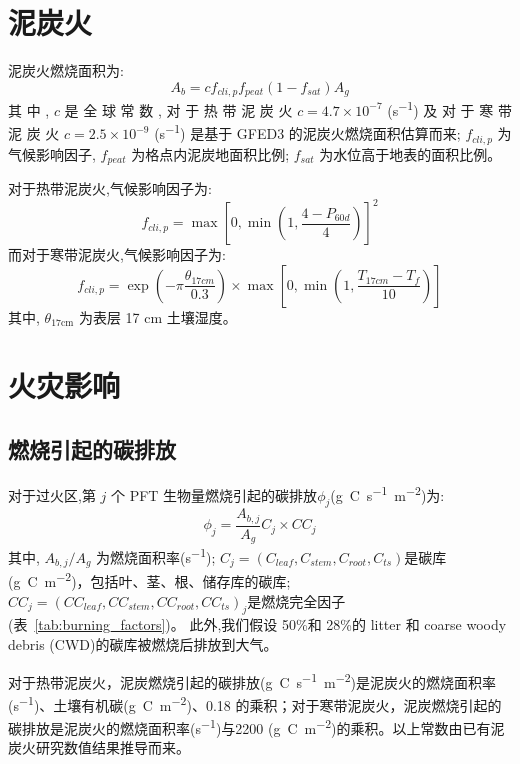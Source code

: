 \section{泥炭火}  

泥炭火燃烧面积为:   
\begin{equation}
A_{b}=c f_{c l i, p} f_{peat}\left(1-f_{sat}\right) A_{g}
\end{equation}
其 中 , $c$ 是 全 球 常 数 , 对 于 热 带 泥 炭 火 $c=4.7\times10^{-7}$ (\unit{s^{-1}}) 及 对 于 寒 带 泥 炭 火 $c=2.5\times10^{-9}$ (\unit{s^{-1}}) 是基于 GFED3 的泥炭火燃烧面积估算而来; $f_{cli,p}$ 为气候影响因子, $f_{peat}$ 为格点内泥炭地面积比例; $f_{sat}$ 为水位高于地表的面积比例。  

对于热带泥炭火,气候影响因子为:  
\begin{equation}
f_{c l i, p}=\max \left[0, \min \left(1, \frac{4-P_{60 d}}{4}\right)\right]^{2}
\end{equation}
而对于寒带泥炭火,气候影响因子为:  
\begin{equation}
f_{c l i, p}=\exp \left(-\pi \frac{\theta_{17 c m}}{0.3}\right) \times \max \left[0, \min \left(1, \frac{T_{17 c m}-T_{f}}{10}\right)\right]
\end{equation}
其中, $\theta_{\text{17cm}}$ 为表层 17 cm 土壤湿度。

\section{火灾影响}
\subsection{燃烧引起的碳排放}  

对于过火区,第 $j$ 个 PFT 生物量燃烧引起的碳排放${\phi}_j$(\unit{g.C.s^{-1}.m^{-2}})为:  
%
\begin{equation}
\phi_{j}=\frac{A_{b, j}}{A_{g}} C_{j} \times C C_{j}
\end{equation}
%
其中, $A_{b,j}/A_g$ 为燃烧面积率(\unit{s^{-1}}); $
C_{j}=\left(C_{leaf}, C_{stem}, C_{root}, C_{t s}\right)
$是碳库(\unit{g.C.m^{-2}})，包括叶、茎、根、储存库的碳库; $
C C_{j}=\left(C C_{leaf}, C C_{stem}, C C_{root}, C C_{t s}\right)_{j}
$是燃烧完全因子 (表~\ref{tab:burning_factors})。 此外,我们假设 50\%和 28\%的 litter 和 coarse woody debris (CWD)的碳库被燃烧后排放到大气。  


对于热带泥炭火，泥炭燃烧引起的碳排放(\unit{g.C.s^{-1}.m^{-2}})是泥炭火的燃烧面积率(\unit{s^{-1}})、土壤有机碳(\unit{g.C.m^{-2}})、0.18 的乘积；对于寒带泥炭火，泥炭燃烧引起的碳排放是泥炭火的燃烧面积率(\unit{s^{-1}})与2200 (\unit{g.C.m^{-2}})的乘积。以上常数由已有泥炭火研究数值结果推导而来。

